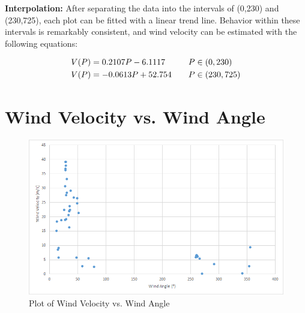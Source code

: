 \documentclass{article}
\begin{document}
\begin{flushleft}
\textbf{Interpolation:} After separating the data into the intervals of (0,230) and (230,725), each plot can be fitted with a linear trend line.  Behavior within these intervals is remarkably consistent, and wind velocity can be estimated with the following equations:
\end{flushleft}

\begin{align*}
\centering
    V(P) &= 0.2107P - 6.1117&& \text{\quad $P\in(0,230)$} \\
    V(P) &= -0.0613P + 52.754 && \text{\quad $P\in(230,725)$} \\
\end{align*}



\part{Wind Velocity vs. Wind Angle}
\label{alan}

\begin{figure}[H]
  \centering
  \includegraphics[width=\textwidth]{alan-data.png}
  \caption{Plot of Wind Velocity vs. Wind Angle}
\end{figure}
\end{document}
